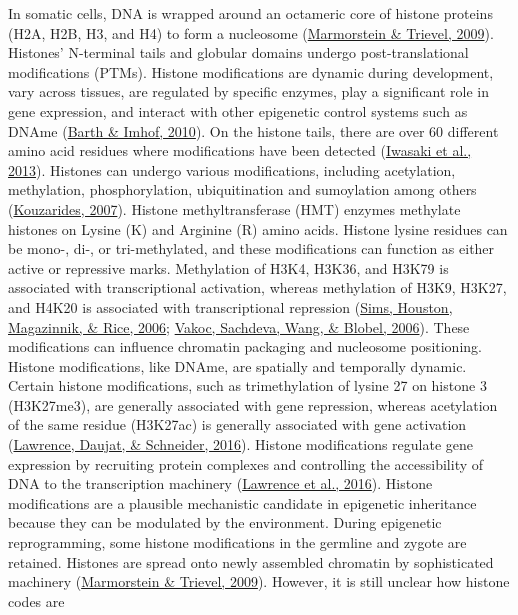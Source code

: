 \documentclass[12pt,twoside]{reedthesis}
\begin{document}
In somatic cells, DNA is wrapped around an octameric core of histone
proteins (H2A, H2B, H3, and H4) to form a nucleosome (\protect\hyperlink{ref-marmorstein2009}{Marmorstein \& Trievel, 2009}).
Histones' N-terminal tails and globular domains undergo
post-translational modifications (PTMs). Histone modifications are
dynamic during development, vary across tissues, are regulated by
specific enzymes, play a significant role in gene expression, and
interact with other epigenetic control systems such as DNAme
(\protect\hyperlink{ref-barth2010}{Barth \& Imhof, 2010}). On the histone tails, there are over 60 different amino
acid residues where modifications have been detected (\protect\hyperlink{ref-iwasaki2013}{Iwasaki et al., 2013}).
Histones can undergo various modifications, including acetylation,
methylation, phosphorylation, ubiquitination and sumoylation among
others (\protect\hyperlink{ref-kouzarides2007}{Kouzarides, 2007}). Histone methyltransferase (HMT) enzymes
methylate histones on Lysine (K) and Arginine (R) amino acids. Histone
lysine residues can be mono-, di-, or tri-methylated, and these
modifications can function as either active or repressive marks.
Methylation of H3K4, H3K36, and H3K79 is associated with transcriptional
activation, whereas methylation of H3K9, H3K27, and H4K20 is associated
with transcriptional repression (\protect\hyperlink{ref-sims2006}{Sims, Houston, Magazinnik, \& Rice, 2006}; \protect\hyperlink{ref-vakoc2006}{Vakoc, Sachdeva, Wang, \& Blobel, 2006}). These
modifications can influence chromatin packaging and nucleosome
positioning. Histone modifications, like DNAme, are spatially and
temporally dynamic. Certain histone modifications, such as
trimethylation of lysine 27 on histone 3 (H3K27me3), are generally
associated with gene repression, whereas acetylation of the same residue
(H3K27ac) is generally associated with gene activation (\protect\hyperlink{ref-lawrence2016}{Lawrence, Daujat, \& Schneider, 2016}).
Histone modifications regulate gene expression by recruiting protein
complexes and controlling the accessibility of DNA to the transcription
machinery (\protect\hyperlink{ref-lawrence2016}{Lawrence et al., 2016}). Histone modifications are a plausible
mechanistic candidate in epigenetic inheritance because they can be
modulated by the environment. During epigenetic reprogramming, some
histone modifications in the germline and zygote are retained. Histones
are spread onto newly assembled chromatin by sophisticated machinery
(\protect\hyperlink{ref-marmorstein2009}{Marmorstein \& Trievel, 2009}). However, it is still unclear how histone codes are
\end{document}
